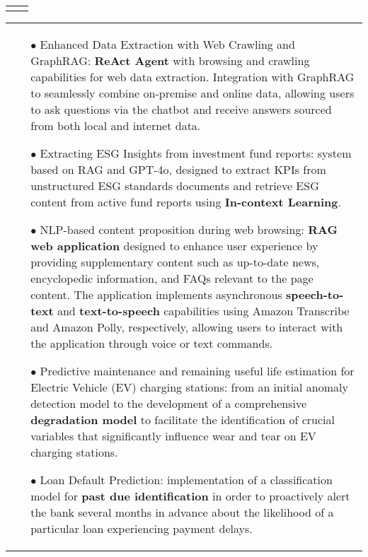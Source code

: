 \documentclass[11pt,a4paper,sans,english]{moderncv}
\makeatletter
\renewcommand*{\cventry}[6][.25em]{%
	\vspace{1.5mm}%
	\begin{tabular*}{\textwidth}{@{\extracolsep{\fill}}ll}%
		\ifthenelse{\equal{#3}{}}{}{\textbf{#3}} &
		\ifthenelse{\equal{#2}{}}{}{#4 #6 #2}\\%
	\end{tabular*}%
	\par\addvspace{#1}}
\newcommand*{\mycvitem}[2][.25em]{%
	\vspace{-.25em}%
	\begin{tabular}{@{}p{\textwidth}@{}}%
		\small#2%
	\end{tabular}%
	\par\addvspace{-0.7em}}
\newcommand*{\cvtag}[1]{%
	\textcolor{lightgray!50!black}{\fbox{\mathstrut\scriptsize\textsf{\textbf{#1}}}}}
\makeatother
\begin{document}
	\cventry{\scalebox{0.9}{\faCalendar\ 03/2023--12/2024}}{Machine Learning Engineer - Consultant}{\scalebox{0.9}{\faBuilding\ \href{https://www.linksmt.it/}{\textit{Links Management \& Technology}}}}{}{\scalebox{0.9}{\faMapMarker\ Bari}}{}
	\mycvitem{%
		\vspace*{-.6cm}
		\begin{flushleft}
			\noindent
			\cvtag{Python} \cvtag{Java} \cvtag{Docker} \cvtag{Gitlab CI/CD} \cvtag{LangChain} \cvtag{Milvus} \cvtag{Amazon Web Services: EC2, S3, Lambda, Transcribe, Polly, SNS, EventBridge} \cvtag{Pandas} \cvtag{FastAPI} \cvtag{Spring Boot} \cvtag{Git} \cvtag{Keras} \cvtag{Redis}
			\cvtag{PostgreSQL} \cvtag{Keycloak} \cvtag{Mosquitto} \cvtag{KNIME} \cvtag{Nginx}
		\end{flushleft}
		\vspace*{-.2cm}
		\begin{itemize}
			\item[$\bullet$] Enhanced Data Extraction with Web Crawling and GraphRAG: \textbf{ReAct Agent} with browsing and crawling capabilities for web data extraction. Integration with GraphRAG to seamlessly combine on-premise and online data, allowing users to ask questions via the chatbot and receive answers sourced from both local and internet data.
			\item[$\bullet$] Extracting ESG Insights from investment fund reports: system based on RAG and GPT-4o, designed to extract KPIs from unstructured ESG standards documents and retrieve ESG content from active fund reports using \textbf{In-context Learning}.
			\item[$\bullet$] NLP-based content proposition during web browsing: \textbf{RAG web application} designed to enhance user experience by providing supplementary content such as up-to-date news, encyclopedic information, and FAQs relevant to the page content. The application implements asynchronous \textbf{speech-to-text} and \textbf{text-to-speech} capabilities using Amazon Transcribe and Amazon Polly, respectively, allowing users to interact with the application through voice or text commands.
			\item[$\bullet$] Predictive maintenance and remaining useful life estimation for Electric Vehicle (EV) charging stations: from an initial anomaly detection model to the development of a comprehensive \textbf{degradation model} to facilitate the identification of crucial variables that significantly influence wear and tear on EV charging stations.
			\item[$\bullet$] Loan Default Prediction: implementation of a classification model for \textbf{past due identification} in order to proactively alert the bank several months in advance about the likelihood of a particular loan experiencing payment delays.

\end{itemize}}
\end{document}

